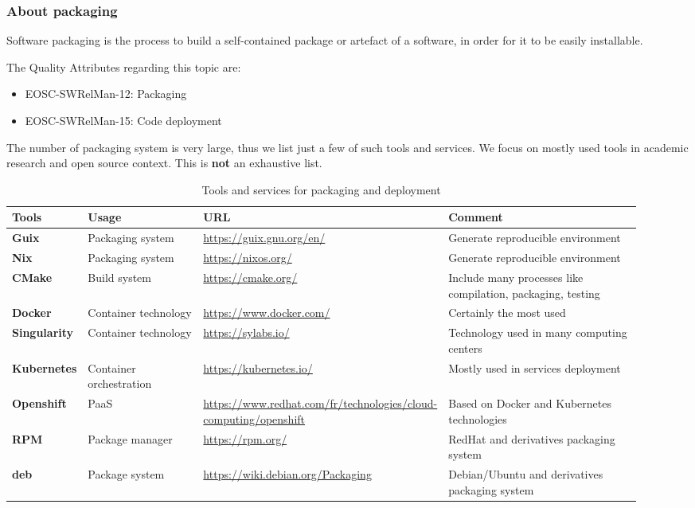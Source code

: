 \subsubsection{About packaging}

Software packaging is the process to build a self-contained package or artefact of a software, in order for it to be easily installable.

The Quality Attributes regarding this topic are:

\begin{itemize}
  \item EOSC-SWRelMan-12: Packaging
  \item EOSC-SWRelMan-15: Code deployment
\end{itemize}

The number of packaging system is very large, thus we list just a few of such tools and services. We focus on mostly used tools in academic research and open
source context. This is {\bf not} an exhaustive list.

\begin{center}
\begin{table}[h]

  \small
  \begin{tabular}{|p{0.12\linewidth}|p{0.2\linewidth}|p{0.25\linewidth}|p{0.35\linewidth}|} \hline

    \textbf{Tools} & \textbf{Usage} & \textbf{URL} & \textbf{Comment} \\ \hline \hline
    \textbf{Guix} & Packaging system & \url{https://guix.gnu.org/en/} & Generate reproducible environment \\ \hline
    \textbf{Nix} & Packaging system & \url{https://nixos.org/} & Generate reproducible environment \\ \hline
    \textbf{CMake} & Build system & \url{https://cmake.org/} & Include many processes like compilation, packaging, testing  \\ \hline
    \textbf{Docker} & Container technology & \url{https://www.docker.com/} &  Certainly the most used \\ \hline
    \textbf{Singularity} & Container technology & \url{https://sylabs.io/} & Technology used in many computing centers \\ \hline
    \textbf{Kubernetes} & Container orchestration & \url{https://kubernetes.io/} & Mostly used in services deployment  \\ \hline
    \textbf{Openshift} & PaaS & \url{https://www.redhat.com/fr/technologies/cloud-computing/openshift} & Based on Docker and Kubernetes technologies  \\ \hline
    \textbf{RPM} & Package manager & \url{https://rpm.org/} & RedHat and derivatives packaging system \\ \hline
    \textbf{deb} & Package system & \url{https://wiki.debian.org/Packaging} & Debian/Ubuntu and derivatives packaging system \\ \hline

  \end{tabular}
  \caption{Tools and services for packaging and deployment}
  \label{tab:tools_pack01}
\end{table}
\end{center}

